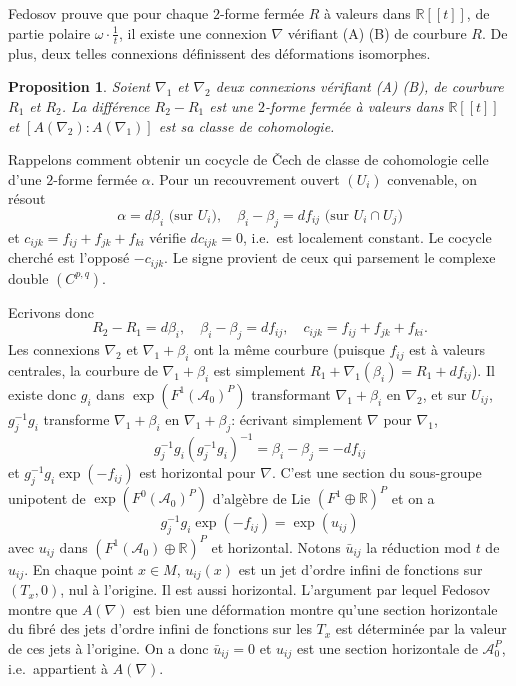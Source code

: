 \documentclass[11pt,a4paper]{article}
\theoremstyle{plain}
\newtheorem{proposition}[theorem]{Proposition}
\theoremstyle{definition}
\newcommand{\R}{\mathbb{R}}
\begin{document}
\subsection{}
Fedosov prouve que pour chaque $2$-forme ferm\'ee $R$ \`a valeurs dans $\R[[t]]$, de partie polaire $\omega \cdot \frac{1}{t}$, il existe une connexion $\nabla$ v\'erifiant (A) (B) de courbure $R$.
De plus, deux telles connexions d\'efinissent des d\'eformations isomorphes.

\begin{proposition}
Soient $\nabla_{1}$ et $\nabla_{2}$ deux connexions v\'erifiant \emph{(A) (B)}, de courbure $R_{1}$ et $R_{2}$. La diff\'erence $R_{2} - R_{1}$ est une $2$-forme ferm\'ee \`a valeurs dans $\R[[t]]$ et $[A(\nabla_{2}) : A(\nabla_{1})]$ est sa classe de cohomologie.
\end{proposition}

Rappelons comment obtenir un cocycle de \v{C}ech de classe de cohomologie celle d'une $2$-forme ferm\'ee $\alpha$. Pour un recouvrement ouvert $(U_{i})$ convenable, on r\'esout
\[
\alpha = d\beta_{i} \text{ (sur } U_{i}), \quad \beta_{i} - \beta_{j} = df_{ij} \text{ (sur } U_{i} \cap U_{j})
\]
et $c_{ijk} = f_{ij} + f_{jk} + f_{ki}$ v\'erifie $dc_{ijk} = 0$, i.e.\ est localement constant. Le cocycle
cherch\'e est l'oppos\'e $-c_{ijk}$. Le signe provient de ceux qui parsement le complexe double $(C^{p,q})$.

Ecrivons donc
\[
R_{2} - R_{1} = d\beta_{i}, \quad \beta_{i} - \beta_{j} = df_{ij}, \quad c_{ijk} = f_{ij} + f_{jk} + f_{ki}.
\]
Les connexions $\nabla_{2}$ et $\nabla_{1} + \beta_{i}$ ont la m\^eme courbure (puisque $f_{ij}$ est \`a valeurs
centrales, la courbure de $\nabla_{1} + \beta_{i}$ est simplement $R_{1} + \nabla_{1}(\beta_{i}) = R_{1} + df_{ij}$). Il existe
donc $g_{i}$ dans $\exp(F^{1}(\mathcal{A}_{0})^{P})$ transformant $\nabla_{1} + \beta_{i}$ en $\nabla_{2}$, et sur $U_{ij}$, $g_{j}^{-1}g_{i}$ transforme $\nabla_{1} + \beta_{i}$ en $\nabla_{1} + \beta_{j}$: \'ecrivant simplement $\nabla$ pour $\nabla_{1}$,
\[
g_{j}^{-1} g_{i} (g_{j}^{-1} g_{i})^{-1} = \beta_{i} - \beta_{j} = -df_{ij}
\]
et $g_{j}^{-1} g_{i} \exp(-f_{ij})$ est horizontal pour $\nabla$. C'est une section du sous-groupe unipotent de $\exp(F^{0}(\mathcal{A}_{0})^{P})$ d'alg\`ebre de Lie $(F^{1} \oplus \R)^{P}$ et on a
\[
g_{j}^{-1} g_{i} \exp(-f_{ij}) = \exp(u_{ij})
\]
avec $u_{ij}$ dans $(F^{1}(\mathcal{A}_{0}) \oplus \R)^{P}$ et horizontal. Notons $\bar{u}_{ij}$ la r\'eduction mod $t$ de $u_{ij}$.
En chaque point $x \in M$, $u_{ij}(x)$ est un jet d'ordre infini de fonctions sur $(T_{x}, 0)$, nul
\`a l'origine. Il est aussi horizontal. L'argument par lequel Fedosov montre que $A(\nabla)$
est bien une d\'eformation montre qu'une section horizontale du fibr\'e des jets d'ordre infini de fonctions sur les $T_{x}$ est d\'etermin\'ee par la valeur de ces jets \`a l'origine. On a donc $\bar{u}_{ij} = 0$ et $u_{ij}$ est une section horizontale de $\mathcal{A}_{0}^{P}$, i.e.\ appartient \`a $A(\nabla)$.
\end{document}

